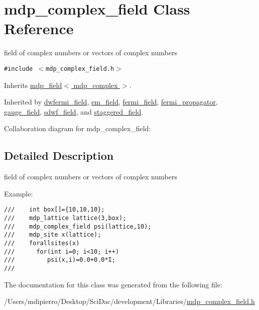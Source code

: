 \hypertarget{classmdp__complex__field}{
\section{mdp\_\-complex\_\-field Class Reference}
\label{classmdp__complex__field}
}
field of complex numbers or vectors of complex numbers  


{\tt \#include $<$mdp\_\-complex\_\-field.h$>$}

Inherits \hyperlink{classmdp__field}{mdp\_\-field$<$ mdp\_\-complex $>$}.

Inherited by \hyperlink{classdwfermi__field}{dwfermi\_\-field}, \hyperlink{classem__field}{em\_\-field}, \hyperlink{classfermi__field}{fermi\_\-field}, \hyperlink{classfermi__propagator}{fermi\_\-propagator}, \hyperlink{classgauge__field}{gauge\_\-field}, \hyperlink{classsdwf__field}{sdwf\_\-field}, and \hyperlink{classstaggered__field}{staggered\_\-field}.

Collaboration diagram for mdp\_\-complex\_\-field:

\subsection{Detailed Description}
field of complex numbers or vectors of complex numbers 

Example: 

\footnotesize\begin{verbatim}
///    int box[]={10,10,10};
///    mdp_lattice lattice(3,box);
///    mdp_complex_field psi(lattice,10);
///    mdp_site x(lattice);
///    forallsites(x)
///      for(int i=0; i<10; i++)
///         psi(x,i)=0.0+0.0*I;
/// \end{verbatim}
\normalsize
 

The documentation for this class was generated from the following file:\begin{CompactItemize}
\item 
/Users/mdipierro/Desktop/SciDac/development/Libraries/\hyperlink{mdp__complex__field_8h}{mdp\_\-complex\_\-field.h}\end{CompactItemize}
